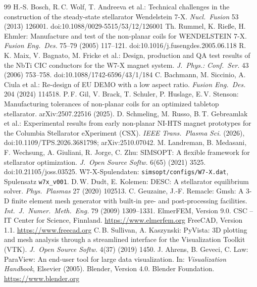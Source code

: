 \documentclass[10pt,a4paper]{article}
\begin{document}
\begin{thebibliography}{99}\small
{} H.-S. Bosch, R.\,C. Wolf, T. Andreeva et al.: Technical challenges in the construction of
  the steady-state stellarator Wendelstein 7-X. \emph{Nucl.\ Fusion} 53 (2013) 126001.
  doi:10.1088/0029-5515/53/12/126001
 Th. Rummel, K. Rieße, H. Ehmler: Manufacture and test of the non-planar coils for
  WENDELSTEIN 7-X. \emph{Fusion Eng.\ Des.} 75--79 (2005) 117--121. doi:10.1016/j.fusengdes.2005.06.118
 R.\,K. Maix, V. Bagnato, M. Fricke et al.: Design, production and QA test results of the
  NbTi CIC conductors for the W7-X magnet system. \emph{J.\ Phys.: Conf.\ Ser.} 43 (2006) 753--758.
  doi:10.1088/1742-6596/43/1/184
 C. Bachmann, M. Siccinio, A. Ciula et al.: Re-design of EU DEMO with a low aspect ratio.
  \emph{Fusion Eng.\ Des.} 204 (2024) 114518.
 P.\,F. Gil, V. Brack, T. Schuler, P. Huslage, E.\,V. Stenson: Manufacturing tolerances of
  non-planar coils for an optimized tabletop stellarator. arXiv:2507.22516 (2025).
 D. Schmeling, M. Russo, B.\,T. Gebreamlak et al.: Experimental results from early
  non-planar NI-HTS magnet prototypes for the Columbia Stellarator eXperiment (CSX). \emph{IEEE Trans.\ Plasma
  Sci.} (2026), doi:10.1109/TPS.2026.3681798; arXiv:2510.07042.
 M. Landreman, B. Medasani, F. Wechsung, A. Giuliani, R. Jorge, C. Zhu: SIMSOPT: A flexible
  framework for stellarator optimization. \emph{J.\ Open Source Softw.} 6(65) (2021) 3525.
  doi:10.21105/joss.03525. W7-X-Spulendaten: \texttt{simsopt/configs/W7-X.dat}, Spulensatz \texttt{w7x\_v001}.
 D.\,W. Dudt, E. Kolemen: DESC: A stellarator equilibrium solver. \emph{Phys.\ Plasmas} 27 (2020)
  102513.
 C. Geuzaine, J.-F. Remacle: Gmsh: A 3-D finite element mesh generator with built-in pre- and
  post-processing facilities. \emph{Int.\ J.\ Numer.\ Meth.\ Eng.} 79 (2009) 1309--1331.
 ElmerFEM, Version 9.0. CSC -- IT Center for Science, Finnland. \url{https://www.elmerfem.org}
 FreeCAD, Version 1.1. \url{https://www.freecad.org}
 C.\,B. Sullivan, A. Kaszynski: PyVista: 3D plotting and mesh analysis through a streamlined
  interface for the Visualization Toolkit (VTK). \emph{J.\ Open Source Softw.} 4(37) (2019) 1450.
 J. Ahrens, B. Geveci, C. Law: ParaView: An end-user tool for large data visualization. In:
  \emph{Visualization Handbook}, Elsevier (2005).
 Blender, Version 4.0. Blender Foundation. \url{https://www.blender.org}

\end{thebibliography}
\end{document}
